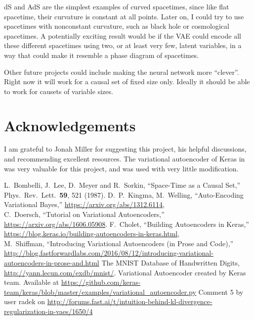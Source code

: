 \documentclass[letterpaper,10pt]{article}
\begin{document}
dS and AdS are the simplest examples of curved spacetimes, since like flat spacetime, their curvature is constant at all points.  Later on, I could 
try to use spacetimes with nonconstant curvature, such as black hole or cosmological spacetimes.  A potentially exciting result would be if the VAE 
could encode all these different spacetimes using two, or at least very few, latent variables, in a way that could make it resemble a phase diagram of 
spacetimes.

Other future projects could include making the neural network more ``clever''.  Right now it will work for a causal set of fixed size only.  Ideally 
it should be able to work for causets of variable sizes.



\section{Acknowledgements}
I am grateful to Jonah Miller for suggesting this project, his helpful discussions, and recommending excellent resources.  
The variational autoencoder of Keras in \cite{kerasauto} was very valuable for this project, and was used with very little modification.

\begin{thebibliography}{99}
L.~Bombelli, J.~Lee, D.~Meyer and R.~Sorkin,
  ``Space-Time as a Causal Set,''
  Phys.\ Rev.\ Lett.\  {\bf 59}, 521 (1987).
D.~P.~Kingma, M.~Welling, ``Auto-Encoding Variational Bayes,'' \href{https://arxiv.org/abs/1312.6114}{https://arxiv.org/abs/1312.6114},\\
C.~Doersch, ``Tutorial on Variational Autoencoders,'' \href{https://arxiv.org/abs/1606.05908}{https://arxiv.org/abs/1606.05908}.
F.~Cholet, ``Building Autoencoders in Keras,'' \href{https://blog.keras.io/building-autoencoders-in-keras.html}{https://blog.keras.io/building-autoencoders-in-keras.html},\\
M.~Shiffman, ``Introducing Variational Autoencoders (in Prose and Code),'' \href{http://blog.fastforwardlabs.com/2016/08/12/introducing-variational-autoencoders-in-prose-and.html}
{http://blog.fastforwardlabs.com/2016/08/12/introducing-variational-autoencoders-in-prose-and.html}
 The MNIST Database of Handwritten Digits, \href{http://yann.lecun.com/exdb/mnist/}{http://yann.lecun.com/exdb/mnist/}.
 Variational Autoencoder created by Keras team. 
 Available at \href{https://github.com/keras-team/keras/blob/master/examples/variational_autoencoder.py}{https://github.com/keras-team/keras/blob/master/examples/variational\_autoencoder.py}
 Comment 5 by user radek on \href{http://forums.fast.ai/t/intuition-behind-kl-divergence-regularization-in-vaes/1650/4}
{http://forums.fast.ai/t/intuition-behind-kl-divergence-regularization-in-vaes/1650/4}
\end{thebibliography}
\end{document}

